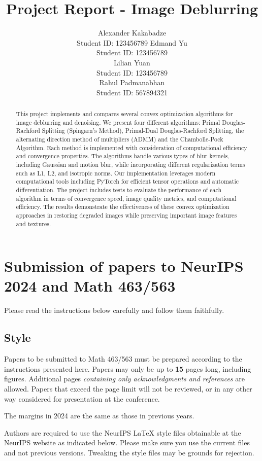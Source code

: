 \documentclass{article}
\title{Project Report - Image Deblurring}
\author{%
  Alexander Kakabadze \\
  Student ID: 123456789
  \And
  Edmand Yu \\
  Student ID: 123456789\\
 \AND
 Lilian Yuan\\
 Student ID: 123456789\\
 \And
 Rahul Padmanabhan\\
 Student ID: 567894321\\ 
}
\begin{document}
\maketitle


\begin{abstract}
  This project implements and compares several convex optimization algorithms for image deblurring and denoising.
  We present four different algorithms: Primal Douglas-Rachford Splitting (Spingarn's Method), Primal-Dual Douglas-Rachford Splitting, the alternating direction method of multipliers (ADMM) and the Chambolle-Pock Algorithm.
  Each method is implemented with consideration of computational efficiency and convergence properties.
  The algorithms handle various types of blur kernels, including Gaussian and motion blur, while incorporating different regularization terms such as L1, L2, and isotropic norms.
  Our implementation leverages modern computational tools including PyTorch for efficient tensor operations and automatic differentiation.
  The project includes tests to evaluate the performance of each algorithm in terms of convergence speed, image quality metrics, and computational efficiency.
  The results demonstrate the effectiveness of these convex optimization approaches in restoring degraded images while preserving important image features and textures.
\end{abstract}


\section{Submission of papers to NeurIPS 2024 and Math 463/563}


Please read the instructions below carefully and follow them faithfully.


\subsection{Style}


Papers to be submitted to Math 463/563 must be prepared according to the
instructions presented here. Papers may only be up to {\bf 15} pages long,
including figures. Additional pages \emph{containing only acknowledgments and
references} are allowed. Papers that exceed the page limit will not be
reviewed, or in any other way considered for presentation at the conference.


The margins in 2024 are the same as those in previous years.


Authors are required to use the NeurIPS \LaTeX{} style files obtainable at the
NeurIPS website as indicated below. Please make sure you use the current files
and not previous versions. Tweaking the style files may be grounds for
rejection.
\end{document}
